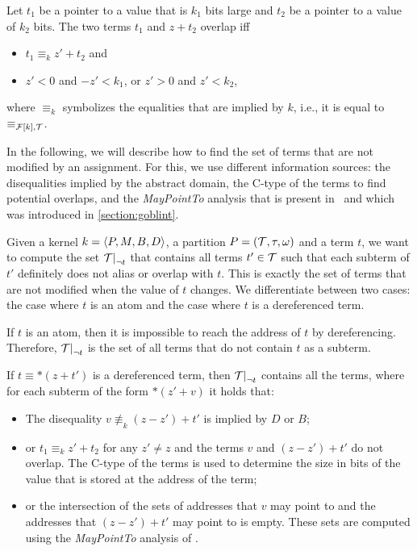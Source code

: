Let $t_1$ be a pointer to a value that is $k_1$ bits large and $t_2$ be a pointer to a value of $k_2$ bits.
The two terms $t_1$ and $z + t_2$ overlap iff
\begin{itemize}
	\item $t_1 \equiv_{k} z' + t_2$ and
	\item $z' < 0$ and $-z' < k_1$, or $z' > 0$ and $z' < k_2$,
\end{itemize}
where $\equiv_{k}$ symbolizes the equalities that are implied by $k$, i.e.,
it is equal to $\equiv_{\mathcal{F}[k],\mathcal{T}}$.

In the following, we will describe how to find the set of terms
that are not modified by an assignment.
For this, we use different information sources: the disequalities implied by the abstract domain, the C-type of the terms to find potential overlaps, and the \emph{MayPointTo} analysis that is present in \goblint\ and which was introduced in \cref{section:goblint}.

Given a kernel $k = \langle P, M, B, D\rangle$, a partition $P = (\mathcal{T}, \tau, \omega)$ and a term $t$,
we want to compute the set $\restr{\T}{\neg t}$ that contains all terms $t' \in \mathcal{T}$ such that each subterm of $t'$ definitely does not alias or overlap with $t$.
This is exactly the set of terms that are not modified when the value of $t$ changes.
We differentiate between two cases: the case where $t$ is an atom and the case where $t$ is a dereferenced term.

If $t$ is an atom, then it is impossible to reach the address of $t$ by dereferencing.
Therefore, $\restr{\T}{\neg t}$ is the set of all terms that do not contain $t$ as a subterm.

If $t \equiv *(z + t')$ is a dereferenced term, then $\restr{\T}{\neg t}$ contains all the terms, where for each subterm of the form $*(z' + v)$ it holds that:
\begin{itemize}
	\item\label{item:diseqs} The disequality $v \nequiv_k (z - z') + t'$ is implied by $D$ or $B$;
    \item\label{item:eqs} or $t_1 \equiv_k z' + t_2$ for any $z' \neq z$ and the terms $v$ and $(z - z') + t'$ do not overlap. The C-type of the terms is used to determine the size in bits of the value that is stored at the address of the term;
    \item or the intersection of the sets of addresses that $v$ may point to and the addresses that $(z - z') + t'$ may point to is empty.
    These sets are computed using the \emph{MayPointTo} analysis of \goblint.
\end{itemize}

